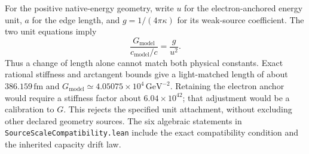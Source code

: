 For the positive native-energy geometry, write $u$ for the electron-anchored
energy unit, $a$ for the edge length, and $g=1/(4\pi\kappa)$ for its weak-source
coefficient. The two unit equations imply
\[
 \frac{G_{\mathrm{model}}}{c_{\mathrm{model}}/c}=\frac{g}{u^2}.
\]
Thus a change of length alone cannot match both physical constants. Exact
rational stiffness and arctangent bounds give a light-matched length of about
$386.159\,\mathrm{fm}$ and $G_{\mathrm{model}}\simeq
4.05075\times10^4\,\mathrm{GeV}^{-2}$. Retaining the electron anchor would
require a stiffness factor about $6.04\times10^{42}$; that adjustment would
be a calibration to $G$. This rejects the specified unit attachment, without
excluding other declared geometry sources. The six algebraic statements in
\texttt{SourceScaleCompatibility.lean} include the exact compatibility
condition and the inherited capacity drift law.
